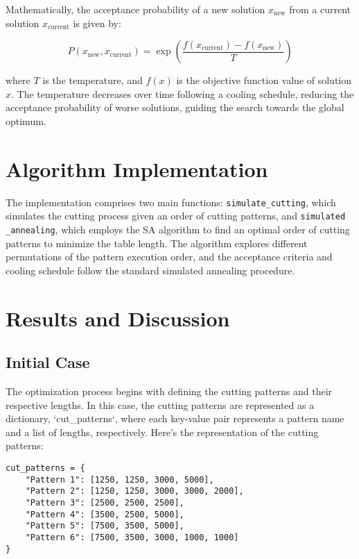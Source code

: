 \documentclass{article}
\begin{document}
Mathematically, the acceptance probability of a new solution \( x_{\text{new}} \) from a current solution \( x_{\text{current}} \) is given by:

\begin{equation}
    P(x_{\text{new}}, x_{\text{current}}) = \exp\left(\frac{f(x_{\text{current}}) - f(x_{\text{new}})}{T}\right)
\end{equation}

where \( T \) is the temperature, and \( f(x) \) is the objective function value of solution \( x \). The temperature decreases over time following a cooling schedule, reducing the acceptance probability of worse solutions, guiding the search towards the global optimum.



\section{Algorithm Implementation}
The implementation comprises two main functions: 
\texttt{simulate\_cutting}, which simulates the cutting process given an order of cutting patterns, and \texttt{simulated \_annealing}, which employs the SA algorithm to find an optimal order of cutting patterns to minimize the table length. The algorithm explores different permutations of the pattern execution order, and the acceptance criteria and cooling schedule follow the standard simulated annealing procedure.

\section{Results and Discussion}

\subsection{Initial Case}
The optimization process begins with defining the cutting patterns and their respective lengths. In this case, the cutting patterns are represented as a dictionary, `cut\_patterns`, where each key-value pair represents a pattern name and a list of lengths, respectively. Here's the representation of the cutting patterns:

\begin{verbatim}
cut_patterns = {
    "Pattern 1": [1250, 1250, 3000, 5000],
    "Pattern 2": [1250, 1250, 3000, 3000, 2000],
    "Pattern 3": [2500, 2500, 2500],
    "Pattern 4": [3500, 2500, 5000],
    "Pattern 5": [7500, 3500, 5000],
    "Pattern 6": [7500, 3500, 3000, 1000, 1000]
}
\end{verbatim}
\end{document}
